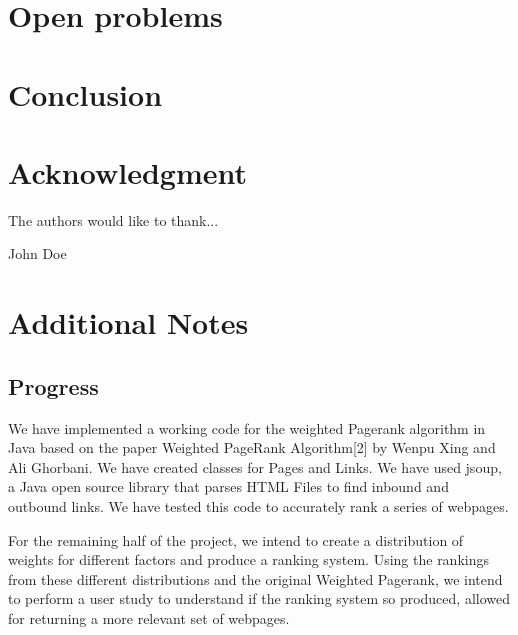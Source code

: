\documentclass[conference]{IEEEtran}
\begin{document}
\section{Open problems}
\blindtext


\section{Conclusion}
\blindtext

\appendices

\section*{Acknowledgment}

The authors would like to thank...

\ifCLASSOPTIONcaptionsoff
  \newpage
\fi


\begin{IEEEbiography}{John Doe}
\blindtext
\end{IEEEbiography}

\section{Additional Notes}

\subsection{Progress}
We have implemented a working code for the weighted Pagerank algorithm in Java based on the paper Weighted PageRank Algorithm[2] by Wenpu Xing and Ali Ghorbani. We have created classes for Pages and Links. We have used jsoup, a Java open source library that parses HTML Files to find inbound and outbound links. We have tested this code to accurately rank a series of webpages.

For the remaining half of the project, we intend to create a distribution of weights for different factors and produce a ranking system. Using the rankings from these different distributions and the original Weighted Pagerank, we intend to perform a user study to understand if the ranking system so produced, allowed for returning a more relevant set of webpages.
\end{document}
